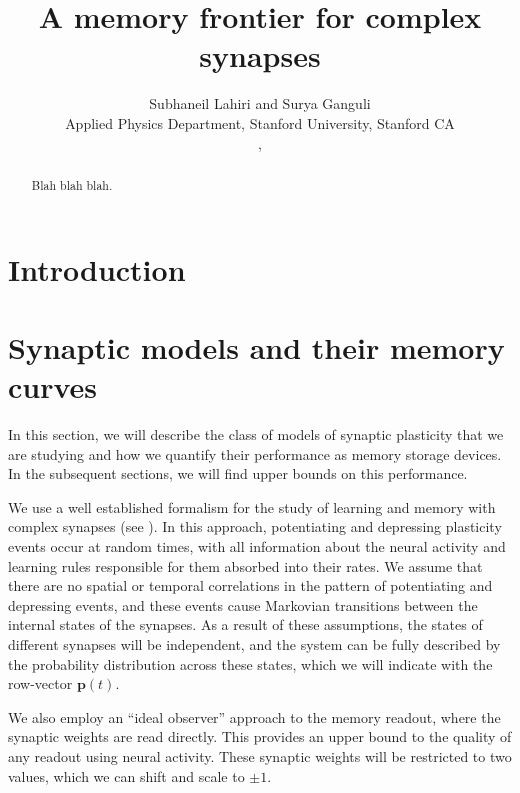 \documentclass{article} %
\title{A memory frontier for complex synapses}
\author{Subhaneil Lahiri and Surya Ganguli\\
Applied Physics Department, Stanford University, Stanford CA\\
\emaillink{sulahiri@stanford.edu}, \emaillink{sulahiri@stanford.edu}
%
}
\newcommand{\pr}{\mathbf{p}}
\begin{document}
\maketitle




\begin{abstract}
  Blah blah blah.
\end{abstract}



\section{Introduction}\label{sec:intro}





\section{Synaptic models and their memory curves}\label{sec:setup}

In this section, we will describe the class of models of synaptic plasticity that we are studying and how we quantify their performance as memory storage devices.
In the subsequent sections, we will find upper bounds on this performance.

We use a well established formalism for the study of learning and memory with complex synapses (see \cite{Fusi2005cascade,Fusi2007multistate,Barrett2008discrete}).
In this approach, potentiating and depressing plasticity events occur at random times, with all information about the neural activity and learning rules responsible for them absorbed into their rates.
We assume that there are no spatial or temporal correlations in the pattern of potentiating and depressing events, and these events cause Markovian transitions between the internal states of the synapses.
As a result of these assumptions, the states of different synapses will be independent, and the system can be fully described by the probability distribution across these states, which we will indicate with the row-vector $\pr(t)$.

We also employ an ``ideal observer'' approach to the memory readout, where the synaptic weights are read directly.
This provides an upper bound to the quality of any readout using neural activity.
These synaptic weights will be restricted to two values, which we can shift and scale to $\pm1$.
\end{document}
